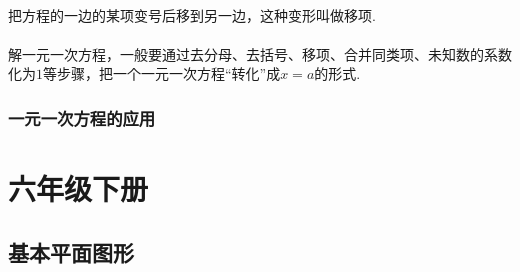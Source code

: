 \documentclass[fontset=windows]{ctexrep}
\begin{document}
\subsection{}
\par 把方程的一边的某项变号后移到另一边，这种变形叫做{\heiti 移项}.
\subsection{}
\subsection{}
\par 解一元一次方程，一般要通过去分母、去括号、移项、合并同类项、未知数的系数化为$1$等步骤，把一个一元一次方程“转化”成$x=a$的形式.
\subsection{}
\section{一元一次方程的应用}
\subsection{}
\subsection{}
\subsection{}
\subsection{}
\subsection{}
\subsection{}
\part{六年级下册}
\chapter{基本平面图形}
\end{document}
